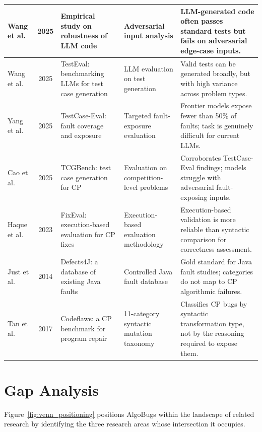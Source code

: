 \begin{table}[h!]
{\begin{tabular}{|p{2.5cm}|c|p{3.5cm}|p{3.5cm}|p{4.5cm}|}
\hline
Wang et al.\ \cite{wang2025robustness} & 2025 & Empirical study on robustness of LLM code & Adversarial input analysis & LLM-generated code often passes standard tests but fails on adversarial edge-case inputs. \\
\hline
Wang et al.\ \cite{wang2025testeval} & 2025 & TestEval: benchmarking LLMs for test case generation & LLM evaluation on test generation & Valid tests can be generated broadly, but with high variance across problem types. \\
\hline
Yang et al.\ \cite{yang2025testcase} & 2025 & TestCase-Eval: fault coverage and exposure & Targeted fault-exposure evaluation & Frontier models expose fewer than 50\% of faults; task is genuinely difficult for current LLMs. \\
\hline
Cao et al.\ \cite{cao2025tcgbench} & 2025 & TCGBench: test case generation for CP & Evaluation on competition-level problems & Corroborates TestCase-Eval findings; models struggle with adversarial fault-exposing inputs. \\
\hline
Haque et al.\ \cite{haque2023fixeval} & 2023 & FixEval: execution-based evaluation for CP fixes & Execution-based evaluation methodology & Execution-based validation is more reliable than syntactic comparison for correctness assessment. \\
\hline
Just et al.\ \cite{just2014defects4j} & 2014 & Defects4J: a database of existing Java faults & Controlled Java fault database & Gold standard for Java fault studies; categories do not map to CP algorithmic failures. \\
\hline
Tan et al.\ \cite{tan2017codeflaws} & 2017 & Codeflaws: a CP benchmark for program repair & 11-category syntactic mutation taxonomy & Classifies CP bugs by syntactic transformation type, not by the reasoning required to expose them. \\
\hline
\end{tabular}%
}
\end{table}

\section{Gap Analysis}

Figure~\ref{fig:venn_positioning} positions AlgoBugs within the landscape of related research by identifying the three research areas whose intersection it occupies.

